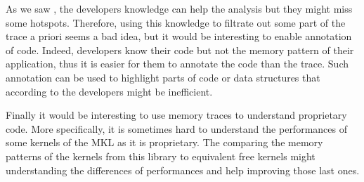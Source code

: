 As we saw , the developers knowledge can help the analysis but they might miss some hotspots.
Therefore, using this knowledge to filtrate out some part of the trace a priori seems a bad idea, but it would be interesting to enable annotation of code.
Indeed, developers know their code but not the memory pattern of their application, thus it is easier for them to annotate the code than the trace.
Such annotation can be used to highlight parts of code or data structures that according to the developers might be inefficient.

Finally it would be interesting to use memory traces to understand proprietary code.
More specifically, it is sometimes hard to understand the performances of some kernels of the \gls{MKL} as it is proprietary.
The comparing the memory patterns of the kernels from this library to equivalent free kernels might understanding the differences of performances and help improving those last ones.
